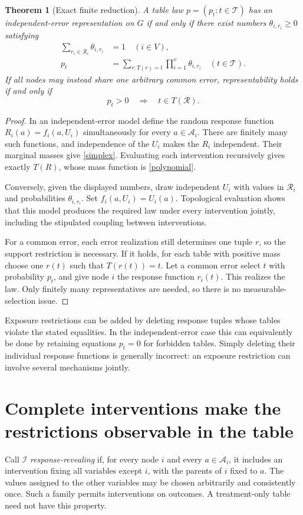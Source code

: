 \documentclass[11pt]{article}
\newtheorem{theorem}{Theorem}
\theoremstyle{remark}
\begin{document}
\begin{theorem}[Exact finite reduction]\label{finite}
A table law $p=(p_t:t\in\mathcal T)$ has an independent-error representation on $G$ if and only if there exist numbers $\theta_{i,r_i}\geq0$ satisfying
\begin{align}
 \sum_{r_i\in\mathcal R_i}\theta_{i,r_i}&=1\quad(i\in V),\label{simplex}\\
 p_t&=\sum_{r:T(r)=t}\prod_{i=1}^v\theta_{i,r_i}
                       \quad(t\in\mathcal T).\label{polynomial}
\end{align}
If all nodes may instead share one arbitrary common error, representability holds if and only if
\[
 p_t>0\quad\Longrightarrow\quad t\in T(\mathcal R).
\]
\end{theorem}
\begin{proof}
In an independent-error model define the random response function
$R_i(a)=f_i(a,U_i)$ simultaneously for every $a\in\mathcal A_i$.
There are finitely many such functions, and independence of the $U_i$ makes the $R_i$ independent. Their marginal masses give \eqref{simplex}. Evaluating each intervention recursively gives exactly $T(R)$, whose mass function is \eqref{polynomial}.

Conversely, given the displayed numbers, draw independent $U_i$ with values in $\mathcal R_i$ and probabilities $\theta_{i,r_i}$. Set $f_i(a,U_i)=U_i(a)$. Topological evaluation shows that this model produces the required law under every intervention jointly, including the stipulated coupling between interventions.

For a common error, each error realization still determines one tuple $r$, so the support restriction is necessary. If it holds, for each table with positive mass choose one $r(t)$ such that $T(r(t))=t$. Let a common error select $t$ with probability $p_t$, and give node $i$ the response function $r_i(t)$. This realizes the law. Only finitely many representatives are needed, so there is no measurable-selection issue.
\end{proof}

Exposure restrictions can be added by deleting response tuples whose tables violate the stated equalities. In the independent-error case this can equivalently be done by retaining equations $p_t=0$ for forbidden tables. Simply deleting their individual response functions is generally incorrect: an exposure restriction can involve several mechanisms jointly.

\section{Complete interventions make the restrictions observable in the table}
Call $\mathcal I$ \emph{response-revealing} if, for every node $i$ and every $a\in\mathcal A_i$, it includes an intervention fixing all variables except $i$, with the parents of $i$ fixed to $a$. The values assigned to the other variables may be chosen arbitrarily and consistently once. Such a family permits interventions on outcomes. A treatment-only table need not have this property.
\end{document}
